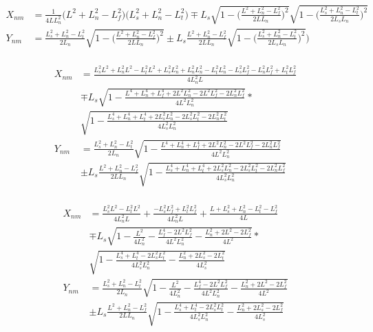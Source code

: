 \documentclass[11pt, landscape]{article}
\begin{document}
\begin{align}
  X_{nm} &= \frac{1}{4LL_n^2}\Big(L^2+L_{n}^2-L_{f}^2\Big)\Big(L_{s}^2+L_{n}^2-L_{t}^2\Big) \mp L_s\sqrt{1-\bigg(\frac{L^2+L_{n}^2-L_{f}^2}{2LL_{n}}\bigg)^2}\sqrt{1-\bigg(\frac{L_{s}^2+L_{n}^2-L_{t}^2}{2L_{s}L_{n}}\bigg)^2}\\
  Y_{nm} &= \frac{L_{s}^2+L_{n}^2-L_{t}^2}{2L_{n}}\sqrt{1-\bigg(\frac{L^2+L_{n}^2-L_{f}^2}{2LL_{n}}\bigg)^2} \pm L_s\frac{L^2+L_{n}^2-L_{f}^2}{2LL_{n}}\sqrt{1-\bigg(\frac{L_{s}^2+L_{n}^2-L_{t}^2}{2L_{s}L_{n}}\bigg)^2} \Bigg)\\
\end{align}

\begin{align}
  X_{nm} &= \frac{L_s^2L^2 + L_n^2L^2 - L_t^2L^2 + L_s^2L_{n}^2 + L_n^2L_{n}^2 - L_t^2L_{n}^2 - L_s^2L_{f}^2 - L_n^2L_{f}^2 + L_t^2L_{f}^2}{4L_n^2L}\\
  &\mp L_s\sqrt{1-\frac{L^4 + L_n^4 + L_f^4 + 2L^2L_n^2 - 2L^2L_f^2 - 2L_n^2L_f^2}{4L^2L_{n}^2}}*\\
  &\sqrt{1-\frac{L_s^4 + L_n^4 + L_t^4 + 2L_s^2L_n^2 - 2L_s^2L_t^2 - 2L_n^2L_t^2}{4L_{s}^2L_{n}^2}}\\
  Y_{nm} &= \frac{L_{s}^2+L_{n}^2-L_{t}^2}{2L_{n}} \sqrt{1-\frac{L^4 + L_n^4 + L_f^4 + 2L^2L_n^2 - 2L^2L_f^2 - 2L_n^2L_f^2}{4L^2L^2_{n}}}\\
  &\pm L_s\frac{L^2+L_{n}^2-L_{f}^2}{2LL_{n}}\sqrt{1 - \frac{L_s^4 + L_n^4 + L_t^4 + 2L_s^2L_n^2 - 2L_s^2L_t^2 - 2L_n^2L_f^2}{4L^2_{s}L^2_{n}}}\\
\end{align}

\begin{align}
  X_{nm} &= \frac{L_s^2L^2 - L_t^2L^2}{4L_n^2L} + \frac{-L_s^2L_{f}^2 + L_t^2L_{f}^2}{4L_n^2L} + \frac{L + L_s^2 + L_n^2 - L_t^2 - L_{f}^2}{4L}\\
  &\mp L_s\sqrt{1 - \frac{L^2}{4L_n^2} - \frac{L_f^4 - 2L^2L_f^2}{4L^2L_n^2} - \frac{L_n^2 + 2L^2 - 2L_f^2}{4L^2}}*\\
  &\sqrt{1 - \frac{L_s^4 + L_t^4 - 2L_s^2L_t^2}{4L_{s}^2L_{n}^2} - \frac{L_n^2 + 2L_s^2 - 2L_t^2}{4L_s^2}}\\  
  Y_{nm} &= \frac{L_{s}^2+L_{n}^2-L_{t}^2}{2L_{n}}\sqrt{1 - \frac{L^2}{4L_{n}^2} - \frac{L_f^4 - 2L^2L_f^2}{4L^2L^2_{n}} - \frac{L_n^2 + 2L^2 - 2L_f^2}{4L^2}}\\
  &\pm L_s\frac{L^2+L_{n}^2-L_{f}^2}{2LL_{n}}\sqrt{1 - \frac{L_s^4 + L_t^4 - 2L_s^2L_t^2}{4L_s^2L_n^2} - \frac{L_n^2 + 2L_s^2 - 2L_f^2}{4L_s^2}}\\
\end{align}
\end{document}
